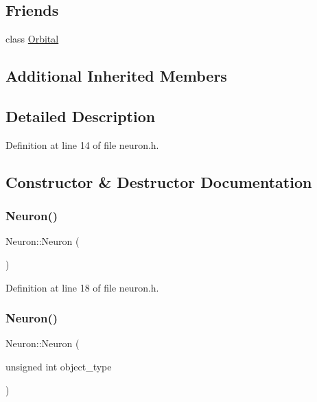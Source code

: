 \subsection*{Friends}
\begin{DoxyCompactItemize}
\item 
class \hyperlink{class_neuron_a2ae3e36fe53bb2c406559e5a7c309027}{Orbital}
\end{DoxyCompactItemize}
\subsection*{Additional Inherited Members}


\subsection{Detailed Description}


Definition at line 14 of file neuron.\+h.



\subsection{Constructor \& Destructor Documentation}
\mbox{\label{class_neuron_a823487d01615fadb8ac19a2768dd9d96}} 
\subsubsection{\texorpdfstring{Neuron()}{Neuron()}\hspace{0.1cm}{\footnotesize\ttfamily [1/4]}}
{\footnotesize\ttfamily Neuron\+::\+Neuron (\begin{DoxyParamCaption}{ }\end{DoxyParamCaption})\hspace{0.3cm}{\ttfamily [inline]}}



Definition at line 18 of file neuron.\+h.

\mbox{\label{class_neuron_acbc433cac4f27aa7f4e05be26c336aa5}} 
\subsubsection{\texorpdfstring{Neuron()}{Neuron()}\hspace{0.1cm}{\footnotesize\ttfamily [2/4]}}
{\footnotesize\ttfamily Neuron\+::\+Neuron (\begin{DoxyParamCaption}\item[{unsigned int}]{object\+\_\+type }\end{DoxyParamCaption})\hspace{0.3cm}{\ttfamily [inline]}}



